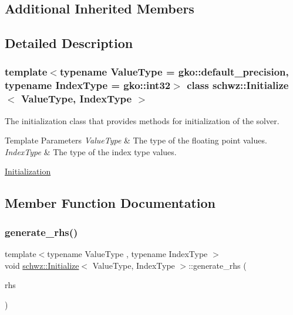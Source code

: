 \subsection*{Additional Inherited Members}


\subsection{Detailed Description}
\subsubsection*{template$<$typename Value\+Type = gko\+::default\+\_\+precision, typename Index\+Type = gko\+::int32$>$\newline
class schwz\+::\+Initialize$<$ Value\+Type, Index\+Type $>$}

The initialization class that provides methods for initialization of the solver. 


\begin{DoxyTemplParams}{Template Parameters}
{\em Value\+Type} & The type of the floating point values. \\
\hline
{\em Index\+Type} & The type of the index type values.\\
\hline
\end{DoxyTemplParams}
\hyperlink{group__init}{Initialization} 

\subsection{Member Function Documentation}
\mbox{\label{classschwz_1_1Initialize_a9dee6b55c599df30410cdf45819b3e28}} 
\subsubsection{\texorpdfstring{generate\+\_\+rhs()}{generate\_rhs()}}
{\footnotesize\ttfamily template$<$typename Value\+Type , typename Index\+Type $>$ \\
void \hyperlink{classschwz_1_1Initialize}{schwz\+::\+Initialize}$<$ Value\+Type, Index\+Type $>$\+::generate\+\_\+rhs (\begin{DoxyParamCaption}\item[{std\+::vector$<$ Value\+Type $>$ \&}]{rhs }\end{DoxyParamCaption})}



